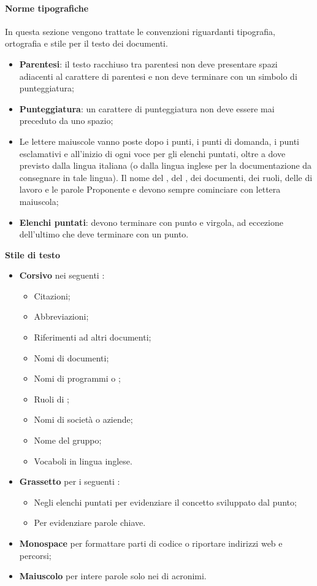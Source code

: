 \paragraph*{Norme tipografiche}
In questa sezione vengono trattate le convenzioni riguardanti tipografia, ortografia e stile per il testo dei documenti. 
\begin{itemize}
\item \textbf{Parentesi}: il testo racchiuso tra parentesi non deve presentare spazi adiacenti al carattere di parentesi e non deve terminare con un simbolo di punteggiatura;
\item \textbf{Punteggiatura}: un carattere di punteggiatura non deve essere mai preceduto da uno spazio;
\item Le lettere maiuscole vanno poste dopo i punti, i punti di domanda, i punti esclamativi e all'inizio di ogni voce per gli elenchi puntati, oltre a dove previsto dalla lingua italiana (o dalla lingua inglese per la documentazione da consegnare in tale lingua). Il nome del , del , dei documenti, dei ruoli, delle  di lavoro e le parole Proponente e  devono sempre cominciare con lettera maiuscola;
  \item \textbf{Elenchi puntati}: devono terminare con punto e virgola, ad eccezione dell'ultimo che deve terminare con un punto.
\end{itemize}

\textbf{Stile di testo} 
\begin{itemize}
\item \textbf{Corsivo}  nei seguenti :
  \begin{itemize}
  \item Citazioni;
  \item Abbreviazioni;
  \item Riferimenti ad altri documenti;
  \item Nomi di documenti;
  \item Nomi di programmi o ;
  \item Ruoli di ;
  \item Nomi di societ\`a o aziende;
  \item Nome del gruppo;
  \item Vocaboli in lingua inglese.
  \end{itemize}
\item \textbf{Grassetto} per i seguenti :
  \begin{itemize}
  \item Negli elenchi puntati per evidenziare il concetto sviluppato dal punto;
  \item Per evidenziare parole chiave.
  \end{itemize}
\item \textbf{Monospace} per formattare parti di codice o riportare indirizzi web e percorsi;
\item \textbf{Maiuscolo} per intere parole solo nei  di acronimi.
\end{itemize}

